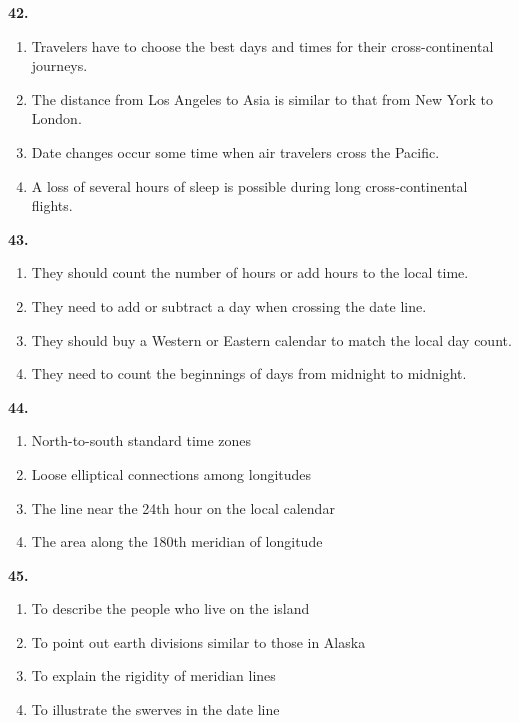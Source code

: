 \documentclass[12pt]{article}
\begin{document}
\noindent\textbf{42.}
\begin{enumerate}[label=(\Alph*),leftmargin=*,itemsep=0.2em]
\item Travelers have to choose the best days and times for their cross-continental journeys.
\item The distance from Los Angeles to Asia is similar to that from New York to London.
\item Date changes occur some time when air travelers cross the Pacific.
\item A loss of several hours of sleep is possible during long cross-continental flights.
\end{enumerate}
\par
\vspace{0.25\baselineskip}
\noindent\textbf{43.}
\begin{enumerate}[label=(\Alph*),leftmargin=*,itemsep=0.2em]
\item They should count the number of hours or add hours to the local time.
\item They need to add or subtract a day when crossing the date line.
\item They should buy a Western or Eastern calendar to match the local day count.
\item They need to count the beginnings of days from midnight to midnight.
\end{enumerate}
\par
\vspace{0.25\baselineskip}
\noindent\textbf{44.}
\begin{enumerate}[label=(\Alph*),leftmargin=*,itemsep=0.2em]
\item North-to-south standard time zones
\item Loose elliptical connections among longitudes
\item The line near the 24th hour on the local calendar
\item The area along the 180th meridian of longitude
\end{enumerate}
\par
\vspace{0.25\baselineskip}
\noindent\textbf{45.}
\begin{enumerate}[label=(\Alph*),leftmargin=*,itemsep=0.2em]
\item To describe the people who live on the island
\item To point out earth divisions similar to those in Alaska
\item To explain the rigidity of meridian lines
\item To illustrate the swerves in the date line
\end{enumerate}
\end{document}
